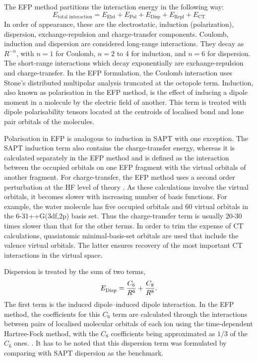 The EFP method partitions the interaction energy in the following way:
\begin{equation*}
    E_{\text{total interaction}} = E_{\text{Elst}} + E_{\text{Pol}} + E_{\text{Disp}} + 
                                    E_{\text{Repl}} + E_{\text{CT}}
\end{equation*}
In order of appearance, these are the electrostatic, induction (polarization), dispersion, exchange-repulsion and charge-transfer components.
Coulomb, induction and dispersion are considered long-range interactions.
They decay as $R^{-n}$, with $n = 1$ for Coulomb, $n = 2$ to 4 for induction, and $n = 6$ for dispersion.
The short-range interactions which decay exponentially are exchange-repulsion and charge-transfer.
In the EFP formulation, the Coulomb interaction uses Stone's distributed multipolar analysis 
\cite{Stone1996a} truncated at the octopole term.
Induction, also known as polarisation in the EFP method, is the effect of inducing a dipole moment in a molecule by the electric field of another.
This term is treated with dipole polarisability tensors located at the centroids of localised bond and lone pair orbitals of the molecules.
\cite{Li2006a}


Polarisation in EFP is analogous to induction in SAPT with one exception. 
The SAPT induction term also contains the charge-transfer energy, whereas it is calculated separately in the EFP method and is defined as the interaction between the occupied orbitals on one EFP fragment with the virtual orbitals of another fragment. 
For charge-transfer, the EFP method uses a second order perturbation at the HF level of theory
\cite{Li2006a}.
As these calculations involve the virtual orbitals, it becomes slower with increasing number of basis functions. 
For example, the water molecule has five occupied orbitals and 60 virtual orbitals in the 6-31++G(3df,2p) basis set. 
Thus the charge-transfer term is usually 20-30 times slower than that for the other terms.
\cite{Li2006a}
In order to trim the expense of CT calculations, quasiatomic minimal-basis-set orbitals 
\cite{Lu2004a} 
are used that include the valence virtual orbitals. The latter ensures recovery of the most important CT interactions in the virtual space.


Dispersion is treated by the sum of two terms,
\begin{equation}
     E^{\text{}}_{\text{Disp}}  = \frac{C_6}{R^6} + \frac{C_8}{R^8}.
\end{equation}
The first term is the induced dipole--induced dipole interaction.
In the EFP method, the coefficients for this $C_6$ term are calculated through the interactions between pairs of localised molecular orbitals of each ion using the time-dependent Hartree-Fock method, with the $C_8$ coefficients being approximated as $1/3$ of the $C_6$ ones.
\cite{Adamovic2005a}.
It has to be noted that this dispersion term was formulated by comparing with SAPT dispersion as the benchmark.


